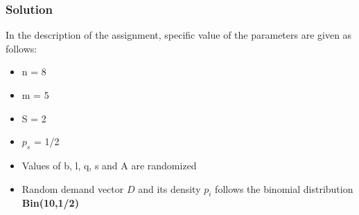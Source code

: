 		\subsubsection{Solution}

		\qquad In the description of the assignment, specific value of the parameters are given as follows:

		\begin{itemize}
			\item n = 8
			\item m = 5
			\item S = 2
			\item $p_s$ = 1/2
			\item Values of b, l, q, s and A are randomized 
			\item Random demand vector $D$ and its density $p_i$ follows the binomial distribution \textbf{Bin(10,1/2)}
		\end{itemize}


		
